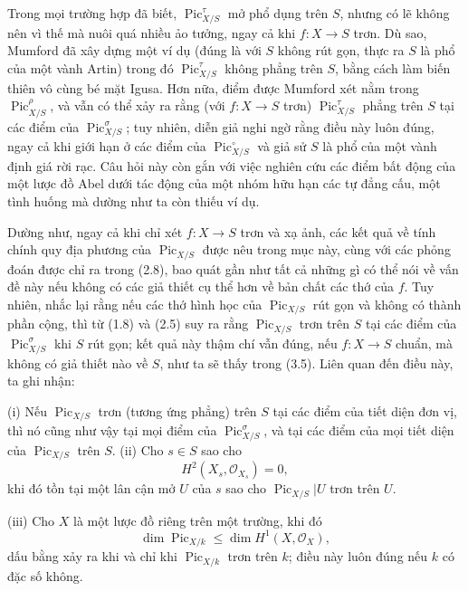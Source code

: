  Trong mọi trường hợp đã biết,
$\operatorname{Pic}_{X/S}^\tau$ mở phổ dụng trên $S$, nhưng có lẽ không nên vì
thế mà nuôi quá nhiều ảo tưởng, ngay cả khi $f:X\longrightarrow S$ trơn. Dù
sao, Mumford đã xây dựng một ví dụ (đúng là với $S$ không rút gọn, thực ra $S$
là phổ của một vành Artin) trong đó $\operatorname{Pic}_{X/S}^\tau$ không
phẳng trên $S$, bằng cách làm biến thiên vô cùng bé mặt Igusa. Hơn nữa, điểm
được Mumford xét nằm trong $\operatorname{Pic}_{X/S}^\rho$, và vẫn có thể xảy
ra rằng (với $f:X\longrightarrow S$ trơn) $\operatorname{Pic}_{X/S}^\tau$
phẳng trên $S$ tại các điểm của $\operatorname{Pic}_{X/S}^\sigma$; tuy nhiên,
diễn giả nghi ngờ rằng điều này luôn đúng, ngay cả khi giới hạn ở các điểm của
$\operatorname{Pic}_{X/S}^\circ$ và giả sử $S$ là phổ của một vành định giá
rời rạc. Câu hỏi này còn gắn với việc nghiên cứu các điểm bất động của một
lược đồ Abel dưới tác động của một nhóm hữu hạn các tự đẳng cấu, một tình
huống mà dường như ta còn thiếu ví dụ.

Dường như, ngay cả khi chỉ xét $f:X\longrightarrow S$ trơn và xạ ảnh, các kết
quả về tính chính quy địa phương của $\operatorname{Pic}_{X/S}$ được nêu trong
mục này, cùng với các phỏng đoán được chỉ ra trong (2.8), bao quát gần như tất
cả những gì có thể nói về vấn đề này nếu không có các giả thiết cụ thể hơn về bản chất
các thớ của $f$. Tuy nhiên, nhắc lại rằng nếu các thớ hình học của
$\operatorname{Pic}_{X/S}$ rút gọn và không có thành phần cộng, thì từ (1.8)
và (2.5) suy ra rằng $\operatorname{Pic}_{X/S}$ trơn trên $S$ tại các điểm của
$\operatorname{Pic}_{X/S}^\sigma$ khi $S$ rút gọn; kết quả này thậm chí vẫn
đúng, nếu $f:X\longrightarrow S$ chuẩn, mà không có giả thiết nào về $S$, như
ta sẽ thấy trong (3.5). Liên quan đến điều này, ta ghi nhận:


\noindent(i) Nếu $\operatorname{Pic}_{X/S}$ trơn (tương ứng phẳng) trên $S$
tại các điểm của tiết diện đơn vị, thì nó cũng như vậy tại mọi điểm của
$\operatorname{Pic}_{X/S}^\sigma$, và tại các điểm của mọi tiết diện của
$\operatorname{Pic}_{X/S}$ trên $S$.
\noindent(ii) Cho $s\in S$ sao cho
\[
H^2(X_s,\mathcal O_{X_s})=0,
\]
khi đó tồn tại một lân cận mở $U$ của $s$ sao cho
$\operatorname{Pic}_{X/S}|U$ trơn trên $U$.

\noindent(iii) Cho $X$ là một lược đồ riêng trên một trường, khi đó
\[
\dim\operatorname{Pic}_{X/k}\leq\dim H^1(X,\mathcal O_X),
\]
dấu bằng xảy ra khi và chỉ khi $\operatorname{Pic}_{X/k}$ trơn trên $k$; điều
này luôn đúng nếu $k$ có đặc số không.


